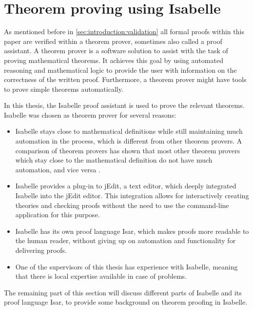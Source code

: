 \section{Theorem proving using Isabelle}
\label{sec:background:theorem_proving_using_isabelle}

As mentioned before in \cref{sec:introduction:validation} all formal proofs within this paper are verified within a theorem prover, sometimes also called a proof assistant. A theorem prover is a software solution to assist with the task of proving mathematical theorems. It achieves this goal by using automated reasoning and mathematical logic to provide the user with information on the correctness of the written proof. Furthermore, a theorem prover might have tools to prove simple theorems automatically.

In this thesis, the Isabelle proof assistant is used to prove the relevant theorems. Isabelle was chosen as theorem prover for several reasons:
\begin{itemize}
    \item Isabelle stays close to mathematical definitions while still maintaining much automation in the process, which is different from other theorem provers. A comparison of theorem provers has shown that most other theorem provers which stay close to the mathematical definition do not have much automation, and vice versa \cite{wiedijk_comparing-provers}.
    \item Isabelle provides a plug-in to jEdit, a text editor, which deeply integrated Isabelle into the jEdit editor. This integration allows for interactively creating theories and checking proofs without the need to use the command-line application for this purpose.
    \item Isabelle has its own proof language Isar, which makes proofs more readable to the human reader, without giving up on automation and functionality for delivering proofs.
    \item One of the supervisors of this thesis has experience with Isabelle, meaning that there is local expertise available in case of problems.
\end{itemize}

The remaining part of this section will discuss different parts of Isabelle and its proof language Isar, to provide some background on theorem proofing in Isabelle.

